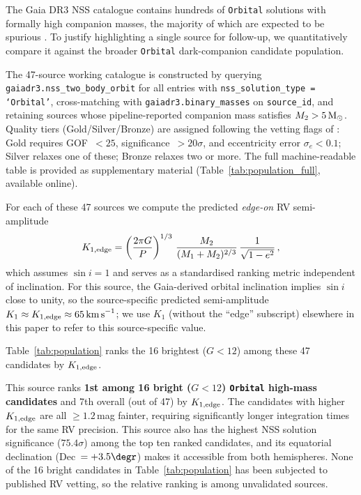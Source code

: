 \documentclass[usenatbib,fleqn]{mnras}
\newcommand{\Msun}{{\rm M}_\odot}
\newcommand{\kms}{{\rm km\,s}^{-1}}
\begin{document}
The Gaia DR3 NSS catalogue contains hundreds of \texttt{Orbital}
solutions with formally high companion masses, the majority of
which are expected to be spurious \citep{ElBadry2024}.
To justify highlighting a single source for follow-up, we
quantitatively compare it against the broader \texttt{Orbital}
dark-companion candidate population.

The 47-source working catalogue is constructed by querying
\texttt{gaiadr3.nss\_two\_body\_orbit} for all entries with
\texttt{nss\_solution\_type = `Orbital'}, cross-matching with
\texttt{gaiadr3.binary\_masses} on \texttt{source\_id}, and
retaining sources whose pipeline-reported companion mass satisfies
$M_2 > 5\,\Msun$.  Quality tiers (Gold/Silver/Bronze) are assigned
following the vetting flags of \citet{GaiaNSS2023}: Gold requires
GOF~$< 25$, significance~$> 20\sigma$, and eccentricity error
$\sigma_e < 0.1$; Silver relaxes one of these; Bronze relaxes two
or more.  The full machine-readable table is provided as
supplementary material (Table~\ref{tab:population_full},
available online).

For each of these 47 sources we compute the predicted
\emph{edge-on} RV semi-amplitude
\begin{equation}
K_{1,{\rm edge}} = \left(\frac{2\pi G}{P}\right)^{1/3}\,
\frac{M_2}{(M_1 + M_2)^{2/3}}\,
\frac{1}{\sqrt{1-e^2}}\,,
\label{eq:K1}
\end{equation}
which assumes $\sin i = 1$ and serves as a standardised ranking
metric independent of inclination.  For this source, the
Gaia-derived orbital inclination implies $\sin i$ close to unity,
so the source-specific predicted semi-amplitude
$K_1 \approx K_{1,{\rm edge}} \approx 65\,\kms$; we use $K_1$
(without the ``edge'' subscript) elsewhere in this paper to refer
to this source-specific value.

Table~\ref{tab:population} ranks the 16 brightest ($G < 12$)
among these 47 candidates by $K_{1,{\rm edge}}$.

This source ranks \textbf{1st among 16 bright ($G < 12$)
\texttt{Orbital} high-mass candidates} and 7th overall (out of 47) by
$K_{1,{\rm edge}}$.  The candidates with higher
$K_{1,{\rm edge}}$ are all $\geq 1.2$\,mag fainter, requiring
significantly longer integration times for the same RV precision.
This source also has the highest NSS solution significance
($75.4\sigma$) among the top ten ranked candidates, and its
equatorial declination (Dec~$= +3.5\degr$) makes it accessible
from both hemispheres.  None of the 16 bright candidates in
Table~\ref{tab:population} has been subjected to published RV
vetting, so the relative ranking is among unvalidated sources.
\end{document}
